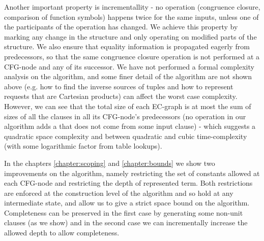 Another important property is incrementallity - no operation (congruence closure, comparison of function symbols) happens twice for the same inputs, unless one of the participants of the operation has changed. We achieve this property by marking any change in the structure and only operating on modified parts of the structure. We also ensure that equality information is propagated eagerly from predecessors, so that the same congruence closure operation is not performed at a CFG-node and any of its successor. 
We have not performed a formal complexity analysis on the algorithm, and some finer detail of the algorithm are not shown above (e.g. how to find the inverse sources of tuples and how to represent requests that are Cartesian products) can affect the worst case complexity.\\
However, we can see that the total size of each EC-graph is at most the sum of sizes of all the clauses in all its CFG-node's predecessors (no operation in our algorithm adds a \GFA{} that does not come from some input clause) - which suggests a quadratic space complexity and between quadratic and cubic time-complexity (with some logarithmic factor from table lookups).

In the chapters \ref{chapter:scoping} and \ref{chapter:bounds} we show two improvements on the algorithm, namely restricting the set of constants allowed at each CFG-node and restricting the depth of represented term. Both restrictions are enforced at the construction level of the algorithm and so hold at any intermediate state, and allow us to give a strict space bound on the algorithm.
Completeness can be preserved in the first case by generating some non-unit clauses (as we show) and in the second case we can incrementally increase the allowed depth to allow completeness.






